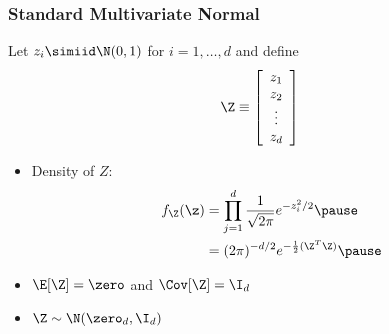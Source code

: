 \documentclass[handout]{beamer}
\begin{document}
\begin{frame}
  \frametitle{Standard Multivariate Normal}
Let  $z_i \simiid \N(0, 1)$ for $i = 1, \ldots, d$ and  define
 $$\Z \equiv \left[
  \begin{array}{c}
    z_1 \\ z_2 \\ \vdots \\ z_d 
  \end{array}
\right]
$$ \pause


 \begin{itemize}
 \item Density of $Z$: \pause
\begin{eqnarray*}
f_{\Z}(\z) & = \prod_{j=1}^d \frac{1}{ \sqrt{2 \pi}} e^{-z_i^2/2}  \pause \\
 \, & = (2\pi)^{-d/2}e^{- \frac{1}{2} (\Z^T\Z)} \pause
\end{eqnarray*}
\item $\E[\Z] = \zero$ and $\Cov[\Z] =  \I_d$   \pause
\item $\Z \sim \N(\zero_d, \I_d)$ \pause

\end{itemize}
\end{frame}
\end{document}
